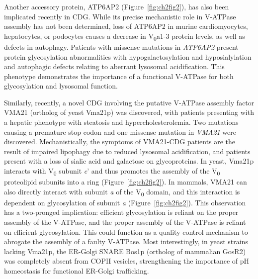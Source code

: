 Another accessory protein, ATP6AP2 (Figure~\ref{fig:ch2fig2}), has also been implicated recently in CDG\cite{rujano_mutations_2017}. While its precise mechanistic role in V-ATPase assembly has not been determined, loss of ATP6AP2 in murine cardiomyocytes, hepatocytes, or podocytes causes a decrease in V\textsubscript{0}a1-3 protein levels, as well as defects in autophagy\cite{kinouchi_role_2013,kinouchi_kenichiro_prorenin_2010,kissing_disruption_2017}. Patients with missense mutations in \emph{ATP6AP2} present protein glycosylation abnormalities with hypogalactosylation and hyposialylation and autophagic defects relating to aberrant lysosomal acidification\cite{rujano_mutations_2017}. This phenotype demonstrates the importance of a functional V-ATPase for both glycosylation and lysosomal function.

Similarly, recently, a novel CDG involving the putative V-ATPase assembly factor VMA21 (ortholog of yeast Vma21p) was discovered, with patients presenting with a hepatic phenotype with steatosis and hypercholesterolemia\cite{cannata_serio_mutations_2020}. Two mutations causing a premature stop codon and one missense mutation in \emph{VMA21} were discovered. Mechanistically, the symptoms of VMA21-CDG patients are the result of impaired lipophagy due to reduced lysosomal acidification, and patients present with a loss of sialic acid and galactose on glycoproteins\cite{cannata_serio_mutations_2020}. In yeast, Vma21p interacts with V\textsubscript{0} subunit \emph{c}’ and thus promotes the assembly of the V\textsubscript{0} proteolipid subunits into a ring (Figure~\ref{fig:ch2fig2})\cite{davis-kaplan_pkr1_2006,malkus_role_2004}. In mammals, VMA21 can also directly interact with subunit \emph{a} of the V\textsubscript{0} domain, and this interaction is dependent on glycosylation of subunit \emph{a} (Figure~\ref{fig:ch2fig2})\cite{esmail_n-linked_2016,esmail_n-linked_2017}. This observation has a two-pronged implication: efficient glycosylation is reliant on the proper assembly of the V-ATPase, and the proper assembly of the V-ATPase is reliant on efficient glycosylation. This could function as a quality control mechanism to abrogate the assembly of a faulty V-ATPase. Most interestingly, in yeast strains lacking Vma21p, the ER-Golgi SNARE Bos1p (ortholog of mammalian GosR2\cite{dingjan_endosomal_2018,linders_stx5-mediated_2019}) was completely absent from COPII vesicles\cite{welsh_genetic_2006}, strengthening the importance of pH homeostasis for functional ER-Golgi trafficking.

